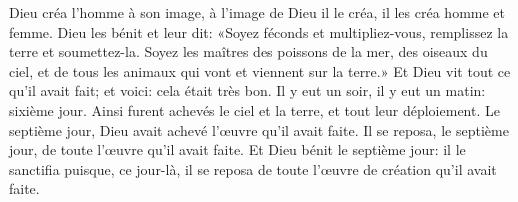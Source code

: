 Dieu créa l’homme à son image,
	à l’image de Dieu il le créa, il les créa homme et femme.
Dieu les bénit et leur dit:
	«Soyez féconds et multipliez-vous, remplissez la terre et soumettez-la.
	Soyez les maîtres des poissons de la mer, des oiseaux du ciel,
	et de tous les animaux qui vont et viennent sur la terre.»
Et Dieu vit tout ce qu’il avait fait; et voici: cela était très bon.
Il y eut un soir, il y eut un matin: sixième jour.
Ainsi furent achevés le ciel et la terre, et tout leur déploiement.
Le septième jour, Dieu avait achevé l’œuvre qu’il avait faite.
Il se reposa, le septième jour, de toute l’œuvre qu’il avait faite.
Et Dieu bénit le septième jour: il le sanctifia puisque, ce jour-là,
	il se reposa de toute l’œuvre de création qu’il avait faite.